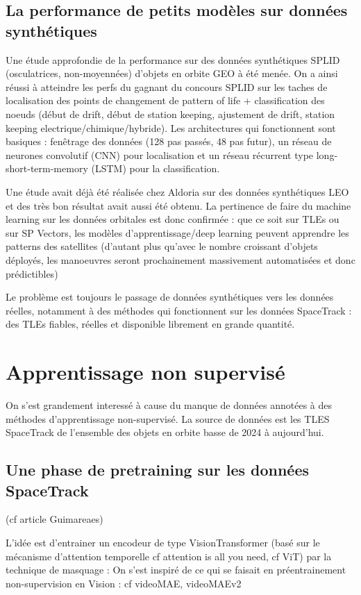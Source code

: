 \documentclass{article}
\begin{document}
\subsection{La performance de petits modèles sur données synthétiques}
    Une étude approfondie de la performance sur des données synthétiques SPLID (osculatrices, non-moyennées) d'objets en orbite GEO à été menée.
    On a ainsi réussi à atteindre les perfs du gagnant du concours SPLID sur les taches de localisation des points de changement de pattern of life + classification des noeuds (début de drift, début de station keeping, ajustement de drift, station keeping electrique/chimique/hybride).
    Les architectures qui fonctionnent sont basiques : fenêtrage des données (128 pas passés, 48 pas futur), un réseau de neurones convolutif (CNN) pour localisation et un réseau récurrent type long-short-term-memory (LSTM) pour la classification.
    

    Une étude avait déjà été réalisée chez Aldoria sur des données synthétiques LEO et des très bon résultat avait aussi été obtenu.
    La pertinence de faire du machine learning sur les données orbitales est donc confirmée : que ce soit sur TLEs ou sur SP Vectors, les modèles d'apprentissage/deep learning peuvent apprendre les patterns des satellites (d'autant plus qu'avec le nombre croissant d'objets déployés, les manoeuvres seront prochainement massivement automatisées et donc prédictibles)

    Le problème est toujours le passage de données synthétiques vers les données réelles, notamment à des méthodes qui fonctionnent sur les données SpaceTrack : des TLEs fiables, réelles et disponible librement en grande quantité.

\section{Apprentissage non supervisé}
    On s'est grandement interessé à cause du manque de données annotées à des méthodes d'apprentissage non-supervisé.
    La source de données est les TLES SpaceTrack de l'ensemble des objets en orbite basse de 2024 à aujourd'hui.
    \subsection{Une phase de pretraining sur les données SpaceTrack}
    (cf article Guimareaes)

    L'idée est d'entrainer un encodeur de type VisionTransformer (basé sur le mécanisme d'attention temporelle cf attention is all you need, cf ViT) par la technique de masquage : 
    On s'est inspiré de ce qui se faisait en préentrainement non-supervision en Vision : cf videoMAE, videoMAEv2 
\end{document}
